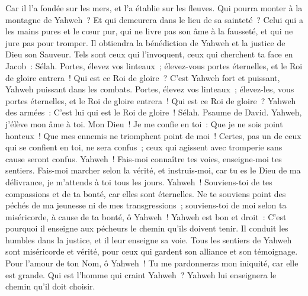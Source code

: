 \begin{multicols}{2}
Car il l'a fondée sur les mers, et l'a établie sur les fleuves.
Qui pourra monter à la montagne de Yahweh~? Et qui demeurera dans le lieu de sa sainteté~?
Celui qui a les mains pures et le cœur pur, qui ne livre pas son âme à la fausseté, et qui ne jure pas pour tromper.
Il obtiendra la bénédiction de Yahweh et la justice de Dieu son Sauveur.
Tels sont ceux qui l'invoquent, ceux qui cherchent ta face en Jacob~: Sélah.
Portes, élevez vos linteaux~; élevez-vous portes éternelles, et le Roi de gloire entrera~!
Qui est ce Roi de gloire~? C'est Yahweh fort et puissant, Yahweh puissant dans les combats.
Portes, élevez vos linteaux~; élevez-les, vous portes éternelles, et le Roi de gloire entrera~!
Qui est ce Roi de gloire~? Yahweh des armées~: C'est lui qui est le Roi de gloire~! Sélah.
\VerseOne{}Psaume de David.  Yahweh, j'élève mon âme à toi.
 Mon Dieu~! Je me confie en toi~: Que je ne sois point honteux~! Que mes ennemis ne triomphent point de moi~!
 Certes, pas un de ceux qui se confient en toi, ne sera confus~; ceux qui agissent avec tromperie sans cause seront confus.
 Yahweh~! Fais-moi connaître tes voies, enseigne-moi tes sentiers.
 Fais-moi marcher selon la vérité, et instruis-moi, car tu es le Dieu de ma délivrance, je m'attends à toi tous les jours.
 Yahweh~! Souviens-toi de tes compassions et de ta bonté, car elles sont éternelles.
 Ne te souviens point des péchés de ma jeunesse ni de mes transgressions~; souviens-toi de moi selon ta miséricorde, à cause de ta bonté, ô Yahweh~!
 Yahweh est bon et droit~: C'est pourquoi il enseigne aux pécheurs le chemin qu'ils doivent tenir.
 Il conduit les humbles dans la justice, et il leur enseigne sa voie.
 Tous les sentiers de Yahweh sont miséricorde et vérité, pour ceux qui gardent son alliance et son témoignage.
 Pour l'amour de ton Nom, ô Yahweh~! Tu me pardonneras mon iniquité, car elle est grande.
 Qui est l'homme qui craint Yahweh~? Yahweh lui enseignera le chemin qu'il doit choisir.

\end{multicols}
